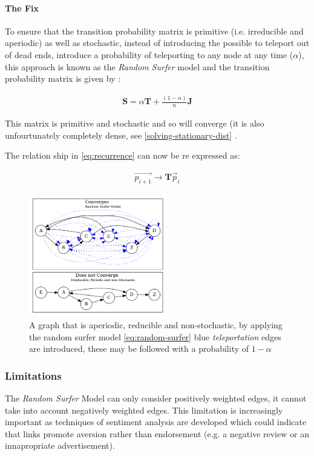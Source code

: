 \documentclass[11pt]{article}
\begin{document}
\paragraph{The Fix}
\label{fix}
To ensure that the transition probability matrix is primitive (i.e. irreducible and aperiodic) as well as stochastic, instead of introducing the possible to teleport out of dead ends, introduce a probability of teleporting to any node at any time (\(\alpha\)), this approach is known as the \emph{Random Surfer} model and the transition probability matrix is given by \cite{larrypageAnatomyLargescaleHypertextual1998} :

\begin{align}
\mathbf{S} = \alpha \mathbf{T} + \frac{(1- \alpha)}{n} \mathbf{J} \label{eq:random-surfer}
\end{align}

This matrix is primitive and stochastic and so will converge (it is also unfourtunately completely dense, see \ref{solving-stationary-dist} \cite[]{langvilleGooglePageRankScience2012}.

The relation ship in \eqref{eq:recurrence} can now be re expressed as:

\begin{align}
\vec{p_{i+1}} \rightarrow \mathbf{T} \vec{p}_{i} \label{eq:random-surfer-recurrence}
\end{align}



\begin{figure}[htbp]
\centering
\includegraphics[width=6cm]{media/dot/random_surfer.dot.png}
\caption{\label{fig:rseg}A graph that is aperiodic, reducible and non-stochastic, by applying the random surfer model \eqref{eq:random-surfer} blue \emph{teleportation} edges are introduced, these may be followed with a probability of \(1 - \alpha\)}
\end{figure}
\subsubsection{Limitations}
\label{sec:org2f22083}
The \emph{Random Surfer} Model can only consider positively weighted edges, it cannot
take into account negatively weighted edges. This limitation is increasingly
important as techniques of sentiment analysis are developed which could indicate
that links promote aversion rather than endorsement (e.g. a negative review or
an innapropriate advertisement).
\end{document}
